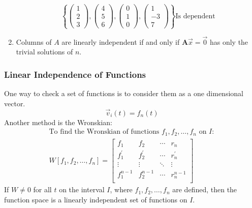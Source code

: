 \begin{enumerate}
            \[
                \left\{
                \left(\begin{array}{c}
                    1\\
                    2\\
                    3
                \end{array}\right),
                \left(\begin{array}{c}
                    4\\
                    5\\
                    6
                \end{array}\right),
                \left(\begin{array}{c}
                    0\\
                    1\\
                    0
                \end{array}\right),
                \left(\begin{array}{c}
                    1\\
                    -3\\
                    7
                \end{array}\right)
                \right\} \text{Is dependent}
            \]
        \item Columns of $A$ are linearly independent if and only if $\mathbf{A}\vec{x} = \vec{0}$ has only the trivial solutions of $n$.
        \end{enumerate}

        \subsubsection{Linear Independence of Functions}
        One way to check a set of functions is to consider them as a one dimensional vector.
        \[
            \vec{v}_i (t) = f_n(t)
        \]
        Another method is the Wronskian:
        \begin{equation}\label{eq:wronskian}
        \begin{aligned}
            \text{To find the Wronskian of functions } f_1, f_2, \ldots, f_n \text{ on } I:\\
            W[f_1, f_2, \ldots, f_n] = \left[ \begin{array}{cccc}
                    f_1 & f_2 & \cdots & r_n\\
                    f^{'}_1 & f^{'}_2 & \cdots & r^{'}_n\\
                    \vdots & \vdots & \ddots & \vdots\\
                    f^{n-1}_1 & f^{n-1}_2 & \cdots & r^{n-1}_n\\
            \end{array} \right]
        \end{aligned}
        \end{equation}
        If $W \neq 0$ for all $t$ on the interval $I$, where $f_1, f_2, \ldots, f_n$ are defined, then the function space is a linearly independent set of functions on $I$.

